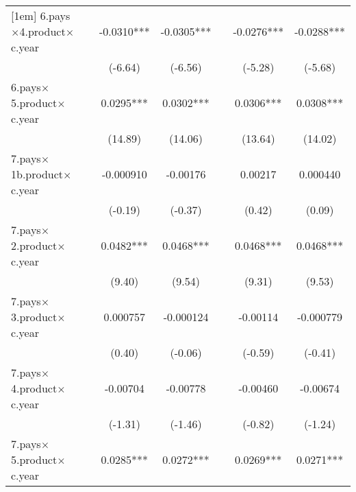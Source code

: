 {\begin{tabular}{l*{6}{c}}
[1em]
6.pays$\times$4.product$\times$c.year&                     &     -0.0310***&     -0.0305***&                     &     -0.0276***&     -0.0288***\\
                    &                     &     (-6.64)         &     (-6.56)         &                     &     (-5.28)         &     (-5.68)         \\
[1em]
6.pays$\times$5.product$\times$c.year&                     &      0.0295***&      0.0302***&                     &      0.0306***&      0.0308***\\
                    &                     &     (14.89)         &     (14.06)         &                     &     (13.64)         &     (14.02)         \\
[1em]
7.pays$\times$1b.product$\times$c.year&                     &   -0.000910         &    -0.00176         &                     &     0.00217         &    0.000440         \\
                    &                     &     (-0.19)         &     (-0.37)         &                     &      (0.42)         &      (0.09)         \\
[1em]
7.pays$\times$2.product$\times$c.year&                     &      0.0482***&      0.0468***&                     &      0.0468***&      0.0468***\\
                    &                     &      (9.40)         &      (9.54)         &                     &      (9.31)         &      (9.53)         \\
[1em]
7.pays$\times$3.product$\times$c.year&                     &    0.000757         &   -0.000124         &                     &    -0.00114         &   -0.000779         \\
                    &                     &      (0.40)         &     (-0.06)         &                     &     (-0.59)         &     (-0.41)         \\
[1em]
7.pays$\times$4.product$\times$c.year&                     &    -0.00704         &    -0.00778         &                     &    -0.00460         &    -0.00674         \\
                    &                     &     (-1.31)         &     (-1.46)         &                     &     (-0.82)         &     (-1.24)         \\
[1em]
7.pays$\times$5.product$\times$c.year&                     &      0.0285***&      0.0272***&                     &      0.0269***&      0.0271***\\

\end{tabular}}
